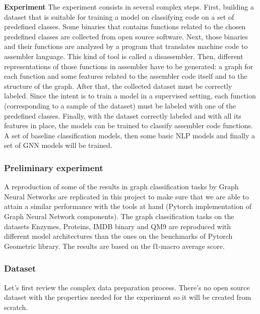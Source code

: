 \textbf{Experiment}
The experiment consists in several complex steps.
First, building a dataset that is suitable for training a model on classifying code on a set of predefined classes. Some binaries that contains functions related to the chosen predefined classes are collected from open source software.  
Next, those binaries and their functions are analyzed by a program that translates machine code to assembler language. This kind of tool is called a disassembler.
Then, different representations of those functions in assembler have to be generated: a graph for each function and some features related to the assembler code itself and to the structure of the graph.
After that, the collected dataset must be correctly labeled. Since the intent is to train a model in a supervised setting, each function (corresponding to a sample of the dataset) must be labeled with one of the predefined classes.
Finally, with the dataset correctly labeled and with all its features in place, the models can be trained to classify assembler code functions. A set of baseline classification models, then some basic NLP models and finally a set of GNN models will be trained. 

\subsubsection{Preliminary experiment}

A reproduction of some of the results in graph classification tasks by Graph Neural Networks are replicated in this project to make sure that we are able to attain a similar performance with the tools at hand (Pytorch implementation of Graph Neural Network components). The graph classification tasks on the datasets Enzymes, Proteins, IMDB binary and QM9 are reproduced with different model architectures than the ones on the benchmarks of Pytorch Geometric library. The results are based on the f1-macro average score.




\subsubsection{Dataset}

Let's first review the complex data preparation process. There's no open source dataset with the properties needed for the experiment so it will be created from scratch.



